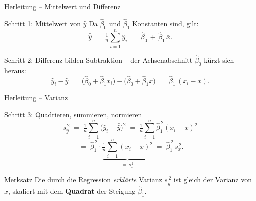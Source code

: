 \documentclass[aspectratio=169,11pt]{beamer}
\begin{document}
\begin{frame}{Herleitung -- Mittelwert und Differenz}
  \begin{block}{Schritt 1: Mittelwert von $\hat{y}$}
    Da $\hat{\beta}_0$ und $\hat{\beta}_1$ Konstanten sind, gilt:
    \[
      \bar{\hat{y}}
        \;=\; \tfrac{1}{n}\sum_{i=1}^{n}\hat{y}_i
        \;=\; \hat{\beta}_0 \,+\, \hat{\beta}_1\,\bar{x}.
    \]
  \end{block}

  \begin{block}{Schritt 2: Differenz bilden}
    Subtraktion -- der Achsenabschnitt $\hat{\beta}_0$ kürzt sich heraus:
    \[
      \hat{y}_i - \bar{\hat{y}}
        \;=\; \bigl(\hat{\beta}_0 + \hat{\beta}_1 x_i\bigr)
            - \bigl(\hat{\beta}_0 + \hat{\beta}_1 \bar{x}\bigr)
        \;=\; \hat{\beta}_1\,(x_i - \bar{x}).
    \]
  \end{block}
\end{frame}

\begin{frame}{Herleitung -- Varianz}
  \begin{block}{Schritt 3: Quadrieren, summieren, normieren}
    \[
      s_{\hat{y}}^{\,2}
        \;=\; \tfrac{1}{n}\!\sum_{i=1}^{n}\!\bigl(\hat{y}_i - \bar{\hat{y}}\bigr)^{2}
        \;=\; \tfrac{1}{n}\!\sum_{i=1}^{n}\!\hat{\beta}_1^{\,2}(x_i - \bar{x})^{2}
    \]
    \[
      \;=\; \hat{\beta}_1^{\,2}\cdot
              \underbrace{\tfrac{1}{n}\!\sum_{i=1}^{n}\!(x_i - \bar{x})^{2}}_{=\,s_x^{\,2}}
        \;=\; \hat{\beta}_1^{\,2}\, s_x^{\,2}.
    \]
  \end{block}

  \begin{alertblock}{Merksatz}
    Die durch die Regression \emph{erklärte} Varianz $s_{\hat{y}}^{\,2}$ ist
    gleich der Varianz von $x$, skaliert mit dem \textbf{Quadrat} der
    Steigung $\hat{\beta}_1$.
  \end{alertblock}
\end{frame}
\end{document}
